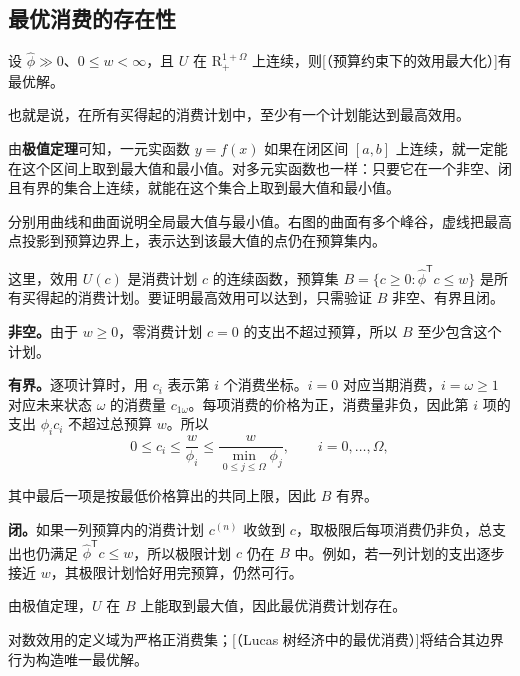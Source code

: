 \subsection{最优消费的存在性}
\begin{tcolorbox}[knowledge]
设 $\hat\phi\gg0$、$0\le w<\infty$，且 $U$ 在 $\mathrm R_+^{1+\Omega}$ 上连续，则[（预算约束下的效用最大化）]有最优解。

也就是说，在所有买得起的消费计划中，至少有一个计划能达到最高效用。
\end{tcolorbox}
由\textbf{极值定理}可知，一元实函数 $y=f(x)$ 如果在闭区间 $[a,b]$ 上连续，就一定能在这个区间上取到最大值和最小值。对多元实函数也一样：只要它在一个非空、闭且有界的集合上连续，就能在这个集合上取到最大值和最小值。

 分别用曲线和曲面说明全局最大值与最小值。右图的曲面有多个峰谷，虚线把最高点投影到预算边界上，表示达到该最大值的点仍在预算集内。


\begin{solution}[label-content={证明},blank-type=none]
这里，效用 $U(c)$ 是消费计划 $c$ 的连续函数，预算集 $B=\{c\ge0:\hat\phi^{\mathsf T}c\le w\}$ 是所有买得起的消费计划。要证明最高效用可以达到，只需验证 $B$ 非空、有界且闭。

\textbf{非空。}由于 $w\ge0$，零消费计划 $c=0$ 的支出不超过预算，所以 $B$ 至少包含这个计划。

\textbf{有界。}逐项计算时，用 $c_i$ 表示第 $i$ 个消费坐标。$i=0$ 对应当期消费，$i=\omega\ge1$ 对应未来状态 $\omega$ 的消费量 $c_{1\omega}$。每项消费的价格为正，消费量非负，因此第 $i$ 项的支出 $\phi_i c_i$ 不超过总预算 $w$。所以
\[
 0\le c_i\le\frac{w}{\phi_i}\le\frac{w}{\min_{0\le j\le\Omega}\phi_j},
 \qquad i=0,\ldots,\Omega,
\]

其中最后一项是按最低价格算出的共同上限，因此 $B$ 有界。

\textbf{闭。}如果一列预算内的消费计划 $c^{(n)}$ 收敛到 $c$，取极限后每项消费仍非负，总支出也仍满足 $\hat\phi^{\mathsf T}c\le w$，所以极限计划 $c$ 仍在 $B$ 中。例如，若一列计划的支出逐步接近 $w$，其极限计划恰好用完预算，仍然可行。

由极值定理，$U$ 在 $B$ 上能取到最大值，因此最优消费计划存在。
\end{solution}

对数效用的定义域为严格正消费集；[（Lucas 树经济中的最优消费）]将结合其边界行为构造唯一最优解。

